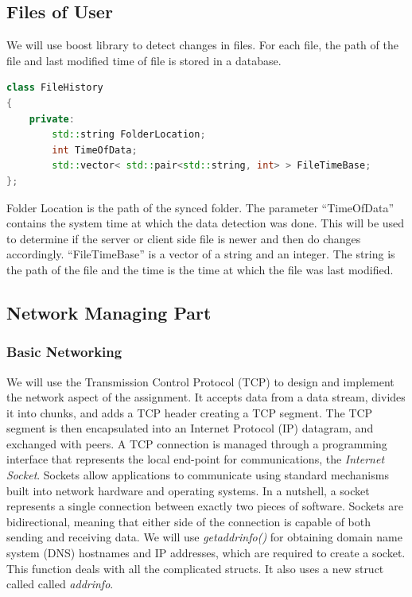 \documentclass{article}
\begin{document}
			\subsection{Files of User}

			We will use boost library to detect changes in files. For each file, the path of the file and last modified time of file is stored in a database.

			\begin{lstlisting}[language=C++, caption={Class Parameters for File History}]
class FileHistory
{
	private:
		std::string FolderLocation;
		int TimeOfData;
		std::vector< std::pair<std::string, int> > FileTimeBase;
};
			\end{lstlisting}

			Folder Location is the path of the synced folder. The parameter ``TimeOfData'' contains the system time at which the data detection was done. This will be used to determine if the server or client side file is newer and then do changes accordingly. ``FileTimeBase'' is a vector of a string and an integer. The string is the path of the file and the time is the time at which the file was last modified.
			
			\subsection{Network Managing Part}
				\subsubsection{Basic Networking}
				We will use the Transmission Control Protocol (TCP) to design and implement the network aspect of the assignment. It accepts data from a data stream, divides it into chunks, and adds a TCP header creating a TCP segment. The TCP segment is then encapsulated into an Internet Protocol (IP) datagram, and exchanged with peers. A TCP connection is managed through a programming interface that represents the local end-point for communications, the \textit{Internet Socket}. Sockets allow applications to communicate using standard mechanisms built into network hardware and operating systems. In a nutshell, a socket represents a single connection between exactly two pieces of software. Sockets are bidirectional, meaning that either side of the connection is capable of both sending and receiving data.
				\newline
				We will use \textit{getaddrinfo()} for obtaining domain name system (DNS) hostnames and IP addresses, which are required to create a socket.  This function deals with all the complicated structs. It also uses a new struct called called \textit{addrinfo}. 
\end{document}
